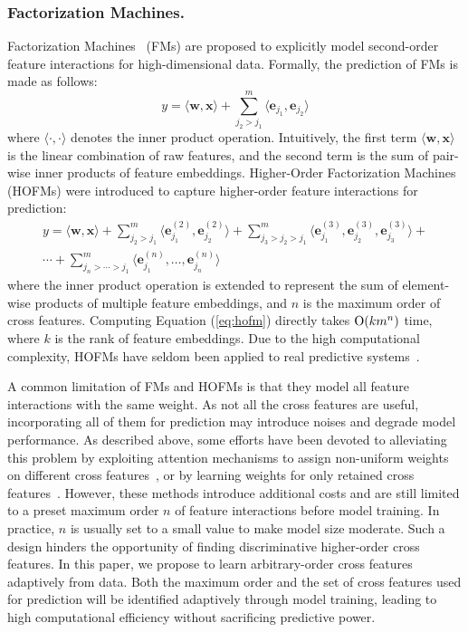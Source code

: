 \documentclass[letterpaper]{article} \usepackage{aaai20}  \usepackage{times}  \usepackage{helvet} \usepackage{courier}  \usepackage[hyphens]{url}  \usepackage{graphicx} \urlstyle{rm} \def\UrlFont{\rm}  \usepackage{graphicx}  \frenchspacing  \setlength{\pdfpagewidth}{8.5in}  \setlength{\pdfpageheight}{11in}
\begin{document}
\subsubsection{Factorization Machines.}
Factorization Machines~\cite{FM} (FMs) are proposed to explicitly model second-order feature interactions for high-dimensional data.
Formally, the prediction of FMs is made as follows:
\begin{equation}
y = \langle \mathbf{w},\mathbf{x} \rangle+\sum_{j_2>j_1}^m \langle \mathbf{e}_{j_1},\mathbf{e}_{j_2} \rangle
\end{equation}
where $\langle\cdot,\cdot\rangle$ denotes the inner product operation. Intuitively, the first term $\langle \mathbf{w},\mathbf{x} \rangle$ is the linear combination of raw features, and the second term is the sum of pair-wise inner products of feature embeddings.
Higher-Order Factorization Machines (HOFMs) were introduced to capture higher-order feature interactions for prediction:
\small
\begin{equation}\label{eq:hofm}
\begin{aligned}
	y = \langle \mathbf{w},\mathbf{x} \rangle+\sum_{j_2>j_1}^m \langle \mathbf{e}_{j_1}^{(2)},\mathbf{e}_{j_2}^{(2)} \rangle+
	\sum_{j_3>j_2>j_1}^m \langle \mathbf{e}_{j_1}^{(3)},\mathbf{e}_{j_2}^{(3)},\mathbf{e}_{j_3}^{(3)} \rangle+\\
	\cdots+\sum_{j_n>\cdots>j_1}^m \langle \mathbf{e}_{j_1}^{(n)},\ldots,\mathbf{e}_{j_n}^{(n)} \rangle
\end{aligned}
\end{equation}
\normalsize
where the inner product operation is extended to represent the sum of element-wise products of multiple feature embeddings, and $n$ is the maximum order of cross features. 
Computing Equation (\ref{eq:hofm}) directly takes ${\rm O}(km^n)$ time, where $k$ is the rank of feature embeddings. Due to the high computational complexity, HOFMs have seldom been applied to real predictive systems~\cite{hofm}.

A common limitation of FMs and HOFMs is that they model all feature interactions with the same weight. As not all the cross features are useful, incorporating all of them for prediction may introduce noises and degrade model performance. As described above, some efforts have been devoted to alleviating this problem by exploiting attention mechanisms to assign non-uniform weights on different cross features~\cite{AFM}, or by learning weights for only retained cross features~\cite{xDeepFM}. However, these methods introduce additional costs and are still limited to a preset maximum order $n$ of feature interactions before model training. In practice, $n$ is usually set to a small value to make model size moderate. Such a design hinders the opportunity of finding discriminative higher-order cross features.
In this paper, we propose to learn arbitrary-order cross features adaptively from data. Both the maximum order and the set of cross features used for prediction will be identified adaptively through model training, leading to high computational efficiency without sacrificing predictive power.
\end{document}
